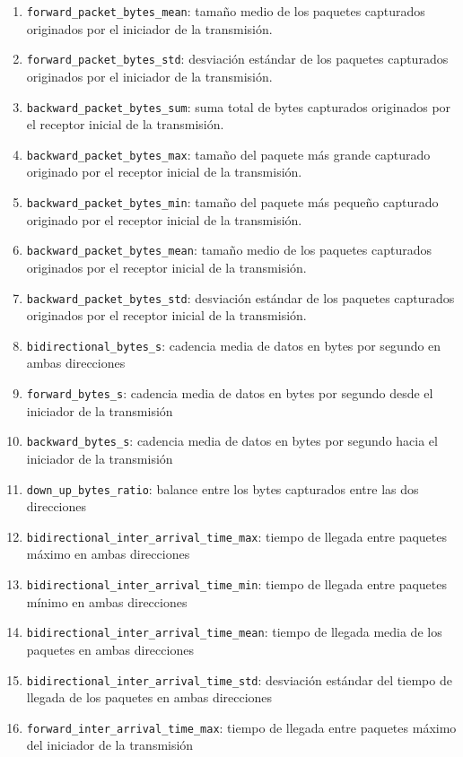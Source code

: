 \begin{enumerate}
  \item \texttt{forward\_packet\_bytes\_mean}: tamaño medio de los paquetes capturados originados por el iniciador de la transmisión.
  \item \texttt{forward\_packet\_bytes\_std}: desviación estándar de los paquetes capturados originados por el iniciador de la transmisión.
  \item \texttt{backward\_packet\_bytes\_sum}: suma total de bytes capturados originados por el receptor inicial de la transmisión.
  \item \texttt{backward\_packet\_bytes\_max}: tamaño del paquete más grande capturado originado por el receptor inicial de la transmisión.
  \item \texttt{backward\_packet\_bytes\_min}: tamaño del paquete más pequeño capturado originado por el receptor inicial de la transmisión.
  \item \texttt{backward\_packet\_bytes\_mean}: tamaño medio de los paquetes capturados originados por el receptor inicial de la transmisión. 
  \item \texttt{backward\_packet\_bytes\_std}: desviación estándar de los paquetes capturados originados por el receptor inicial de la transmisión.
  \item \texttt{bidirectional\_bytes\_s}: cadencia media de datos en bytes por segundo en ambas direcciones
  \item \texttt{forward\_bytes\_s}: cadencia media de datos en bytes por segundo desde el iniciador de la transmisión
  \item \texttt{backward\_bytes\_s}: cadencia media de datos en bytes por segundo hacia el iniciador de la transmisión
  \item \texttt{down\_up\_bytes\_ratio}: balance entre los bytes capturados entre las dos direcciones
  \item \texttt{bidirectional\_inter\_arrival\_time\_max}: tiempo de llegada entre paquetes máximo en ambas direcciones
  \item \texttt{bidirectional\_inter\_arrival\_time\_min}: tiempo de llegada entre paquetes mínimo en ambas direcciones
  \item \texttt{bidirectional\_inter\_arrival\_time\_mean}: tiempo de llegada media de los paquetes en ambas direcciones
  \item \texttt{bidirectional\_inter\_arrival\_time\_std}: desviación estándar del tiempo de llegada de los paquetes en ambas direcciones
  \item \texttt{forward\_inter\_arrival\_time\_max}: tiempo de llegada entre paquetes máximo del iniciador de la transmisión

\end{enumerate}
